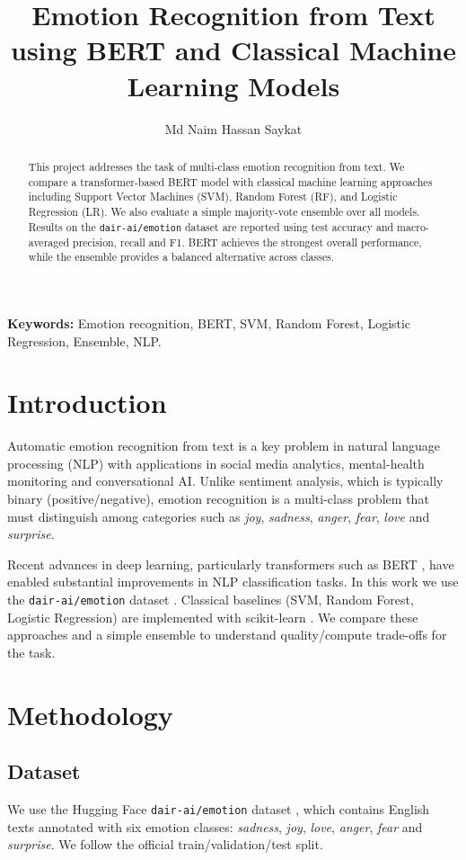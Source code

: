 \documentclass[11pt,a4paper]{article}
\title{\textbf{Emotion Recognition from Text using BERT and Classical Machine Learning Models}}
\author{Md Naim Hassan Saykat}
\date{}
\begin{document}
\maketitle

\begin{abstract}
This project addresses the task of multi-class emotion recognition from text. We compare a transformer-based BERT model with classical machine learning approaches including Support Vector Machines (SVM), Random Forest (RF), and Logistic Regression (LR). We also evaluate a simple majority-vote ensemble over all models. Results on the \texttt{dair-ai/emotion} dataset are reported using test accuracy and macro-averaged precision, recall and F1. BERT achieves the strongest overall performance, while the ensemble provides a balanced alternative across classes.
\end{abstract}

\noindent \textbf{Keywords:} Emotion recognition, BERT, SVM, Random Forest, Logistic Regression, Ensemble, NLP.

\section{Introduction}
Automatic emotion recognition from text is a key problem in natural language processing (NLP) with applications in social media analytics, mental-health monitoring and conversational AI. Unlike sentiment analysis, which is typically binary (positive/negative), emotion recognition is a multi-class problem that must distinguish among categories such as \textit{joy}, \textit{sadness}, \textit{anger}, \textit{fear}, \textit{love} and \textit{surprise}.

Recent advances in deep learning, particularly transformers such as BERT \cite{devlin2019bert}, have enabled substantial improvements in NLP classification tasks. In this work we use the \texttt{dair-ai/emotion} dataset \cite{saravia2018carer}. Classical baselines (SVM, Random Forest, Logistic Regression) are implemented with scikit-learn \cite{pedregosa2011scikit}. We compare these approaches and a simple ensemble to understand quality/compute trade-offs for the task.

\section{Methodology}
\subsection{Dataset}
We use the Hugging Face \texttt{dair-ai/emotion} dataset \cite{saravia2018carer}, which contains English texts annotated with six emotion classes: \textit{sadness}, \textit{joy}, \textit{love}, \textit{anger}, \textit{fear} and \textit{surprise}. We follow the official train/validation/test split.
\end{document}
